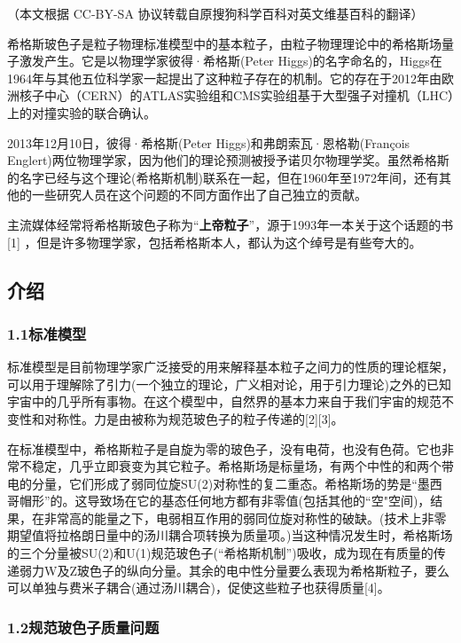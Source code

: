 
（本文根据 CC-BY-SA 协议转载自原搜狗科学百科对英文维基百科的翻译）

  希格斯玻色子是粒子物理标准模型中的基本粒子，由粒子物理理论中的希格斯场量子激发产生。它是以物理学家彼得·希格斯(Peter Higgs)的名字命名的，Higgs在1964年与其他五位科学家一起提出了这种粒子存在的机制。它的存在于2012年由欧洲核子中心（CERN）的ATLAS实验组和CMS实验组基于大型强子对撞机（LHC）上的对撞实验的联合确认。

2013年12月10日，彼得·希格斯(Peter Higgs)和弗朗索瓦·恩格勒(François Englert)两位物理学家，因为他们的理论预测被授予诺贝尔物理学奖。虽然希格斯的名字已经与这个理论(希格斯机制)联系在一起，但在1960年至1972年间，还有其他的一些研究人员在这个问题的不同方面作出了自己独立的贡献。

主流媒体经常将希格斯玻色子称为“\textbf{上帝粒子}”，源于1993年一本关于这个话题的书[1] ，但是许多物理学家，包括希格斯本人，都认为这个绰号是有些夸大的。

\subsection{介绍}

\subsubsection{1.1标准模型}

标准模型是目前物理学家广泛接受的用来解释基本粒子之间力的性质的理论框架，可以用于理解除了引力(一个独立的理论，广义相对论，用于引力理论)之外的已知宇宙中的几乎所有事物。在这个模型中，自然界的基本力来自于我们宇宙的规范不变性和对称性。力是由被称为规范玻色子的粒子传递的[2][3]。

在标准模型中，希格斯粒子是自旋为零的玻色子，没有电荷，也没有色荷。它也非常不稳定，几乎立即衰变为其它粒子。希格斯场是标量场，有两个中性的和两个带电的分量，它们形成了弱同位旋SU(2)对称性的复二重态。希格斯场的势是“墨西哥帽形”的。这导致场在它的基态任何地方都有非零值(包括其他的“空"空间)，结果，在非常高的能量之下，电弱相互作用的弱同位旋对称性的破缺。(技术上非零期望值将拉格朗日量中的汤川耦合项转换为质量项。)当这种情况发生时，希格斯场的三个分量被SU(2)和U(1)规范玻色子(“希格斯机制”)吸收，成为现在有质量的传递弱力W及Z玻色子的纵向分量。其余的电中性分量要么表现为希格斯粒子，要么可以单独与费米子耦合(通过汤川耦合)，促使这些粒子也获得质量[4]。

\subsubsection{1.2规范玻色子质量问题}

